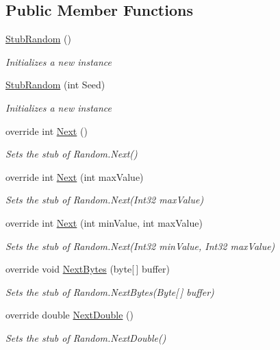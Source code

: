 \subsection*{Public Member Functions}
\begin{DoxyCompactItemize}
\item 
\hyperlink{class_system_1_1_fakes_1_1_stub_random_af2278d7c9d2eac48728b5387beea7a25}{Stub\-Random} ()
\begin{DoxyCompactList}\small\item\em Initializes a new instance\end{DoxyCompactList}\item 
\hyperlink{class_system_1_1_fakes_1_1_stub_random_a43dc2eef993b1cf6d18e04957f241cb9}{Stub\-Random} (int Seed)
\begin{DoxyCompactList}\small\item\em Initializes a new instance\end{DoxyCompactList}\item 
override int \hyperlink{class_system_1_1_fakes_1_1_stub_random_ae9428ebfdc40397b11acb7bf883a9653}{Next} ()
\begin{DoxyCompactList}\small\item\em Sets the stub of Random.\-Next()\end{DoxyCompactList}\item 
override int \hyperlink{class_system_1_1_fakes_1_1_stub_random_ae372a046f417643f5b20c615450c86a1}{Next} (int max\-Value)
\begin{DoxyCompactList}\small\item\em Sets the stub of Random.\-Next(\-Int32 max\-Value)\end{DoxyCompactList}\item 
override int \hyperlink{class_system_1_1_fakes_1_1_stub_random_a8d844858895119cd3f243ff1f962cd93}{Next} (int min\-Value, int max\-Value)
\begin{DoxyCompactList}\small\item\em Sets the stub of Random.\-Next(\-Int32 min\-Value, Int32 max\-Value)\end{DoxyCompactList}\item 
override void \hyperlink{class_system_1_1_fakes_1_1_stub_random_a6f09a0e459a86364a233b321a0ff389b}{Next\-Bytes} (byte\mbox{[}$\,$\mbox{]} buffer)
\begin{DoxyCompactList}\small\item\em Sets the stub of Random.\-Next\-Bytes(\-Byte\mbox{[}$\,$\mbox{]} buffer)\end{DoxyCompactList}\item 
override double \hyperlink{class_system_1_1_fakes_1_1_stub_random_a3266ea18008b128f639c36a5b23b74b8}{Next\-Double} ()
\begin{DoxyCompactList}\small\item\em Sets the stub of Random.\-Next\-Double()\end{DoxyCompactList}\end{DoxyCompactItemize}

